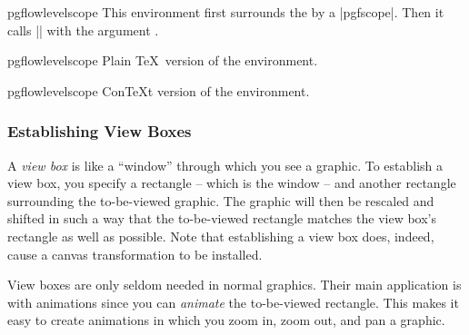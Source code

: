 \begin{environment}{{pgflowlevelscope}}
    This environment first surrounds the  by a
    |{pgfscope}|. Then it calls |\pgflowlevel| with the argument
    .
\begin{codeexample}[]
\end{codeexample}
\end{environment}

\begin{plainenvironment}{{pgflowlevelscope}}
    Plain \TeX\ version of the environment.
\end{plainenvironment}

\begin{contextenvironment}{{pgflowlevelscope}}
    Con\TeX t version of the environment.
\end{contextenvironment}


\subsubsection{Establishing View Boxes}
\label{section-base-view}

A \emph{view box} is like a ``window'' through which you see a graphic. To
establish a view box, you specify a rectangle -- which is the window -- and
another rectangle surrounding the to-be-viewed graphic. The graphic will then
be rescaled and shifted in such a way that the to-be-viewed rectangle matches
the view box's rectangle as well as possible. Note that establishing a view box
does, indeed, cause a canvas transformation to be installed.

View boxes are only seldom needed in normal graphics. Their main application is
with animations since you can \emph{animate} the to-be-viewed rectangle. This
makes it easy to create animations in which you zoom in, zoom out, and pan a
graphic.

